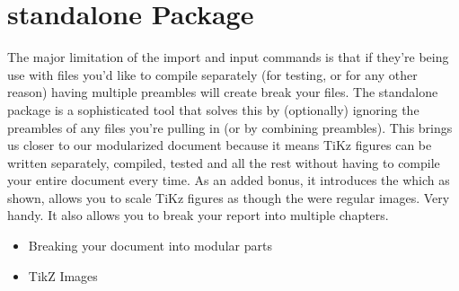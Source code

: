\documentclass[hidelinks, float=false, crop=false]{standalone}
\begin{document}
    \section{standalone Package}
        The major limitation of the import and input commands is that if they're being use with files you'd like to compile separately (for testing, or for any other reason) having multiple preambles will create break your files.
        The standalone package is a sophisticated tool that solves this by (optionally) ignoring the preambles of any files you're pulling in (or by combining preambles).
        This brings us closer to our modularized document because it means TiKz figures can be written separately, compiled, tested and all the rest without having to compile your entire document every time.
        As an added bonus, it introduces the \texttt{} which as shown, allows you to scale TiKz figures as though the were regular images.
        Very handy.
        It also allows you to break your report into multiple chapters.
        \begin{itemize}
            \item Breaking your document into modular parts
            \item TikZ Images
        \end{itemize}
\end{document}
